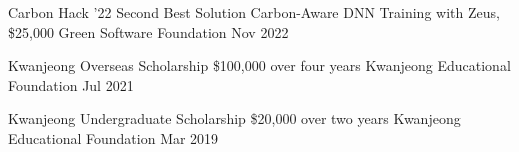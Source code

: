 



\begin{cvhonors}

  \cvhonor
    {Carbon Hack '22 Second Best Solution} %
    {Carbon-Aware DNN Training with Zeus, \$25,000} %
    {Green Software Foundation} %
    {Nov 2022} %

  \cvhonor
    {Kwanjeong Overseas Scholarship} %
    {\$100,000 over four years} %
    {Kwanjeong Educational Foundation} %
    {Jul 2021} %

  \cvhonor
    {Kwanjeong Undergraduate Scholarship} %
    {\$20,000 over two years} %
    {Kwanjeong Educational Foundation} %
    {Mar 2019} %




\end{cvhonors}




